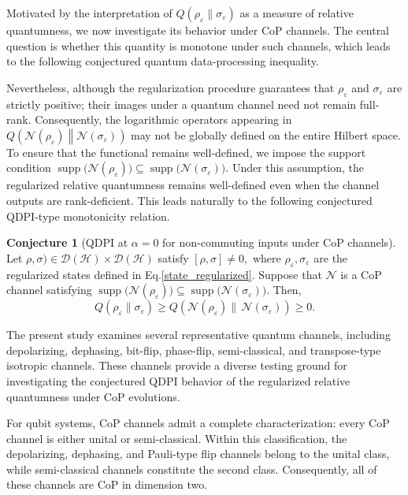 \documentclass[a4paper, amsfonts, amssymb, amsmath, reprint, showkeys, nofootinbib, twoside, aps, pra]{revtex4-2}
\theoremstyle{definition}
\newtheorem{conjecture}[theorem]{Conjecture}
\begin{document}
Motivated by the interpretation of
$Q(\rho_\varepsilon\|\sigma_\varepsilon)$
as a measure of relative quantumness, we now investigate its behavior under CoP channels. The central question is whether this quantity is monotone under such channels, which leads to the following conjectured quantum data-processing inequality.

Nevertheless, although the regularization procedure guarantees that $\rho_\varepsilon$ and $\sigma_\varepsilon$ are strictly positive; their images under a quantum channel need not remain full-rank. Consequently, the logarithmic operators appearing in $Q\left(\mathcal N(\rho_\varepsilon)\middle\|\mathcal N(\sigma_\varepsilon)\right)$ may not be globally defined on the entire Hilbert space. To ensure that the functional remains well-defined, we impose the support condition $\operatorname{supp}\!\bigl(\mathcal N(\rho_\varepsilon)\bigr)\subseteq\operatorname{supp}\!\bigl(\mathcal N(\sigma_\varepsilon)
\bigr).$ Under this assumption, the regularized relative quantumness remains well-defined even when the channel outputs are rank-deficient. This leads naturally to the following conjectured QDPI-type monotonicity relation.

\begin{conjecture}[QDPI at $\alpha=0$ for non-commuting inputs under CoP channels]
\label{conj:QDPI-alpha0}
Let $\rho,\sigma)\in \mathcal D(\mathcal H)\times\mathcal D(\mathcal H)$
satisfy $[\rho,\sigma]\neq0,$ where $\rho_\varepsilon,\sigma_\varepsilon$
are the regularized states defined in Eq.\eqref{state_regularized}.
Suppose that $\mathcal N $ is a CoP channel satisfying $\operatorname{supp}\!\bigl(\mathcal N(\rho_\varepsilon)\bigr) \subseteq\operatorname{supp}\!\bigl(\mathcal N(\sigma_\varepsilon)\bigr). $
Then,
\begin{equation}
    Q(\rho_\varepsilon\|\sigma_\varepsilon)
    \geq
    Q\left(
        \mathcal N(\rho_\varepsilon)\|\,
        \mathcal N(\sigma_\varepsilon)
    \right) \geq 0.
\end{equation}
\end{conjecture}

The present study examines several representative quantum channels, including depolarizing, dephasing, bit-flip, phase-flip, semi-classical, and transpose-type isotropic channels. These channels provide a diverse testing ground for investigating the conjectured QDPI behavior of the regularized relative quantumness under CoP evolutions.

For qubit systems, CoP channels admit a complete characterization: every CoP channel is either unital or semi-classical. Within this classification, the depolarizing, dephasing, and Pauli-type flip channels belong to the unital class, while semi-classical channels constitute the second class. Consequently, all of these channels are CoP in dimension two.
\end{document}
